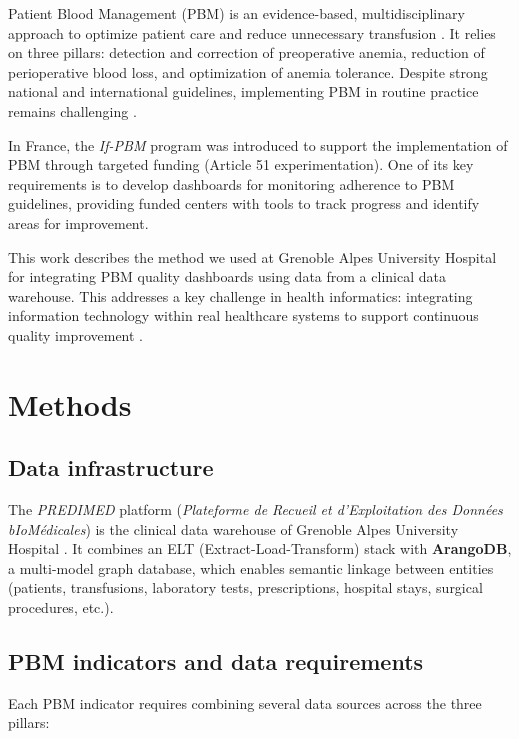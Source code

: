 \documentclass{IOS-Book-Article}
\begin{document}
Patient Blood Management (PBM) is an evidence-based, multidisciplinary approach to optimize patient care and reduce unnecessary transfusion \cite{shander2022global}. It relies on three pillars: detection and correction of preoperative anemia, reduction of perioperative blood loss, and optimization of anemia tolerance. Despite strong national \cite{theissen2024perioperative} and international \cite{tibi2021sts} guidelines, implementing PBM in routine practice remains challenging \cite{godonReductionRedBlood2024}.

In France, the \textit{If-PBM} program was introduced to support the implementation of PBM through targeted funding (Article 51 experimentation). One of its key requirements is to develop dashboards for monitoring adherence to PBM guidelines, providing funded centers with tools to track progress and identify areas for improvement.

This work describes the method we used at Grenoble Alpes University Hospital for integrating PBM quality dashboards using data from a clinical data warehouse. This addresses a key challenge in health informatics: integrating information technology within real healthcare systems to support continuous quality improvement \cite{Rabiei2022}.

\section{Methods}

\subsection{Data infrastructure}

The \textit{PREDIMED} platform (\textit{Plateforme de Recueil et d'Exploitation des Données bIoMédicales}) is the clinical data warehouse of Grenoble Alpes University Hospital \cite{Artemova2019}. It combines an ELT (Extract-Load-Transform) stack with \textbf{ArangoDB}, a multi-model graph database, which enables semantic linkage between entities (patients, transfusions, laboratory tests, prescriptions, hospital stays, surgical procedures, etc.).

\subsection{PBM indicators and data requirements}

Each PBM indicator requires combining several data sources across the three pillars:
\end{document}
